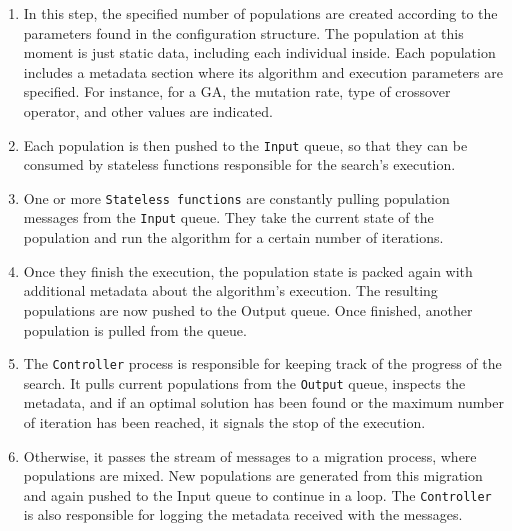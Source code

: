 \documentclass[review]{elsarticle}
\begin{document}
\begin{enumerate}
\item In this step, the specified number of populations are created according to the 
parameters found in the configuration structure. The population at this moment is just
static data, including each individual inside. Each population includes a metadata
section where its algorithm and execution parameters are specified. For instance, 
for a GA, the mutation rate, type of crossover operator, and other values are indicated.

\item Each population is then pushed to the \texttt{Input} queue, so that they can be consumed 
by stateless functions responsible for the search's execution.

\item One or more \texttt{Stateless functions} are constantly pulling population messages
from the \texttt{Input} queue. They take the current state of the population and 
run the algorithm for a certain number of iterations. 

\item Once they finish the execution, the population state
is packed again with additional metadata about the algorithm's execution.
The resulting populations are now pushed to the Output queue. Once finished, another 
population is pulled from the queue.

\item The \texttt{Controller} process is responsible for keeping track of the progress of 
the search. It pulls current populations from the \texttt{Output} queue, inspects the metadata, 
and if an optimal solution has been found or the maximum number of iteration has been
reached, it signals the stop of the execution. 

\item Otherwise, it passes the stream of messages 
to a migration process, where populations are mixed. New populations 
are generated from this migration and again pushed to the Input queue to continue 
in a loop. The \texttt{Controller} is also responsible for logging the metadata received with the
messages.  
\end{enumerate}
\end{document}
